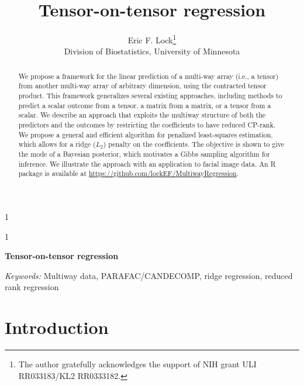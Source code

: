 \documentclass[12pt]{article}
\newcommand{\blind}{1}
\begin{document}
%

\def\spacingset#1{\renewcommand{\baselinestretch}%
{#1}\small\normalsize} \spacingset{1}



\blind
{
  \title{\bf Tensor-on-tensor regression}
  \author{Eric F. Lock\thanks{
    The author gratefully acknowledges the support of NIH grant  ULI RR033183/KL2 RR0333182.}\hspace{.2cm}\\
    Division of Biostatistics, University of Minnesota}
  \maketitle
} \fi

\blind
{
  \bigskip
  \bigskip
  \bigskip
  \begin{center}
    {\LARGE\bf Tensor-on-tensor regression}
\end{center}
  \medskip
} \fi

\bigskip
\begin{abstract}
We propose a framework for the linear prediction of a multi-way array (i.e., a tensor) from another multi-way array of arbitrary dimension, using the contracted tensor product.  This framework generalizes several existing approaches, including methods to predict a scalar outcome from a tensor, a matrix from a matrix, or a tensor from a scalar.  We describe an approach that exploits the multiway structure of both the predictors and the outcomes by restricting the coefficients to have reduced CP-rank.  We propose a general and efficient algorithm for penalized least-squares estimation, which allows for a ridge ($L_2$) penalty on the coefficients.  The objective is shown to give the mode of a Bayesian posterior, which motivates a Gibbs sampling algorithm for inference.  We illustrate the approach with an application to facial image data.  An R package is available at \url{https://github.com/lockEF/MultiwayRegression}. 
\end{abstract}

\noindent%
{\it Keywords:}  Multiway data, PARAFAC/CANDECOMP, ridge regression, reduced rank regression
\vfill

\newpage
\spacingset{1.05} %
\section{Introduction}
\label{intro}
\end{document}
